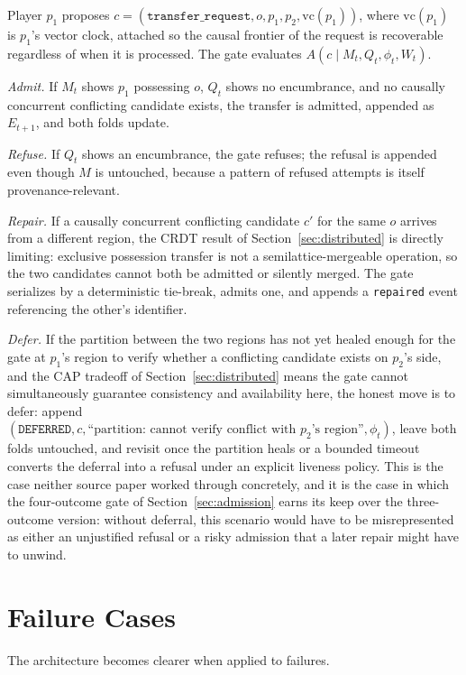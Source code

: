 \documentclass[11pt]{article}
\begin{document}
Player $p_1$ proposes $c = (\texttt{transfer\_request}, o, p_1, p_2, \mathrm{vc}(p_1))$, where $\mathrm{vc}(p_1)$ is $p_1$'s vector clock, attached so the causal frontier of the request is recoverable regardless of when it is processed. The gate evaluates $A(c \mid M_t, Q_t, \phi_t, W_t)$.

\emph{Admit.} If $M_t$ shows $p_1$ possessing $o$, $Q_t$ shows no encumbrance, and no causally concurrent conflicting candidate exists, the transfer is admitted, appended as $E_{t+1}$, and both folds update.

\emph{Refuse.} If $Q_t$ shows an encumbrance, the gate refuses; the refusal is appended even though $M$ is untouched, because a pattern of refused attempts is itself provenance-relevant.

\emph{Repair.} If a causally concurrent conflicting candidate $c'$ for the same $o$ arrives from a different region, the CRDT result of Section~\ref{sec:distributed} is directly limiting: exclusive possession transfer is not a semilattice-mergeable operation, so the two candidates cannot both be admitted or silently merged. The gate serializes by a deterministic tie-break, admits one, and appends a \texttt{repaired} event referencing the other's identifier.

\emph{Defer.} If the partition between the two regions has not yet healed enough for the gate at $p_1$'s region to verify whether a conflicting candidate exists on $p_2$'s side, and the CAP tradeoff of Section~\ref{sec:distributed} means the gate cannot simultaneously guarantee consistency and availability here, the honest move is to defer: append $(\texttt{DEFERRED}, c, \text{``partition: cannot verify conflict with } p_2\text{'s region''}, \phi_t)$, leave both folds untouched, and revisit once the partition heals or a bounded timeout converts the deferral into a refusal under an explicit liveness policy. This is the case neither source paper worked through concretely, and it is the case in which the four-outcome gate of Section~\ref{sec:admission} earns its keep over the three-outcome version: without deferral, this scenario would have to be misrepresented as either an unjustified refusal or a risky admission that a later repair might have to unwind.

\section{Failure Cases}
\label{sec:failures}

The architecture becomes clearer when applied to failures.
\end{document}
